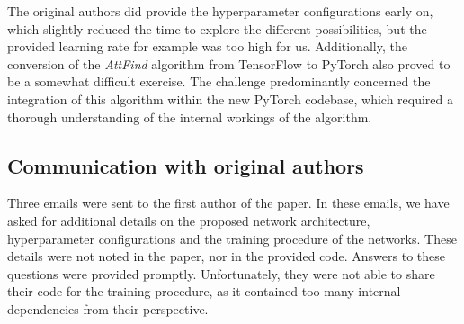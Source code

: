 The original authors did provide the hyperparameter configurations early on, which slightly reduced the time to explore the different possibilities, but the provided learning rate for example was too high for us. Additionally, the conversion of the \textit{AttFind} algorithm from TensorFlow to PyTorch also proved to be a somewhat difficult exercise. The challenge predominantly concerned the integration of this algorithm within the new PyTorch codebase, which required a thorough understanding of the internal workings of the algorithm.


\subsection{Communication with original authors}
Three emails were sent to the first author of the paper. In these emails, we have asked for additional details on the proposed network architecture, hyperparameter configurations and the training procedure of the networks. These details were not noted in the paper, nor in the provided code. Answers to these questions were provided promptly. Unfortunately, they were not able to share their code for the training procedure, as it contained too many internal dependencies from their perspective.

